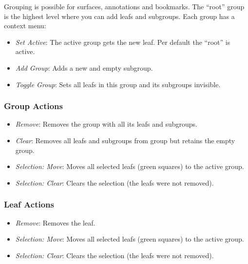 Grouping is possible for surfaces, annotations and bookmarks.
The ``root'' group is the highest level where you can add leafs and subgroups.
Each group has a context menu:
\begin{itemize}
	\item \textit{Set Active}: The active group gets the new leaf. Per default the ``root'' is active.
	\item \textit{Add Group}: Adds a new and empty subgroup.
	\item \textit{Toggle Group}: Sets all leafs in this group and its subgroups invisible.
\end{itemize}

\subsubsection{Group Actions}
\label{sec:groupActions}

\begin{itemize}
	\item \textit{Remove}: Removes the group with all its leafs and subgroups.
	\item \textit{Clear}: Removes all leafs and subgroups from group but retains the empty group. 
	\item \textit{Selection: Move}: Moves all selected leafs (green squares) to the active group.
	\item \textit{Selection: Clear}: Clears the selection (the leafs were not removed).
\end{itemize}
	
\subsubsection{Leaf Actions}
\label{sec:leafActions}

\begin{itemize}
	\item \textit{Remove}: Removes the leaf.
	\item \textit{Selection: Move}: Moves all selected leafs (green squares) to the active group.
	\item \textit{Selection: Clear}: Clears the selection (the leafs were not removed).
\end{itemize}

\newpage

